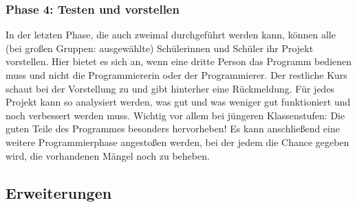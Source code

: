 \subsubsection{Phase 4: Testen und
vorstellen}\label{phase-4-testen-und-vorstellen}

In der letzten Phase, die auch zweimal durchgeführt werden kann, können
alle (bei großen Gruppen: ausgewählte) Schülerinnen und Schüler ihr
Projekt vorstellen. Hier bietet es sich an, wenn eine dritte Person das
Programm bedienen muss und nicht die Programmiererin oder der
Programmierer. Der restliche Kurs schaut bei der Vorstellung zu und gibt
hinterher eine Rückmeldung. Für jedes Projekt kann so analysiert werden,
was gut und was weniger gut funktioniert und noch verbessert werden
muss. Wichtig vor allem bei jüngeren Klassenstufen: Die guten Teile des
Programmes besonders hervorheben! Es kann anschließend eine weitere
Programmierphase angestoßen werden, bei der jedem die Chance gegeben
wird, die vorhandenen Mängel noch zu beheben.

\subsection{Erweiterungen}\label{erweiterungen}

